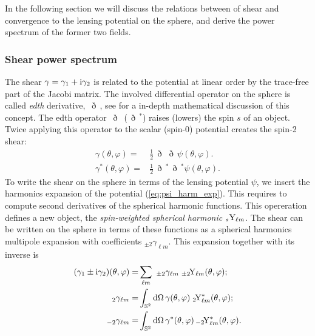 \documentclass[useAMS,usenatbib]{mn2e} %
\newcommand{\edth}{\,\eth\,}
\begin{document}
In the following section we will discuss the relations between of shear and
convergence to the lensing potential on the sphere, and derive the power
spectrum of the former two fields.

\subsubsection{Shear power spectrum}

The shear $\gamma = \gamma_1 + {\rm i} \gamma_2$ is related to the potential at
linear order by the trace-free part of the Jacobi matrix. The involved
differential operator on the sphere is called \emph{edth} derivative, $\edth$,
see \cite{2005PhRvD..72b3516C} for a in-depth mathematical discussion of this
concept. The edth operator $\edth$ ($\edth^\ast$) raises (lowers) the spin $s$
of an object. Twice applying this operator to the scalar (spin-0) potential
creates the spin-2 shear:
%
\begin{align}
  \gamma(\theta, \varphi) = & \frac 1 2 \edth \edth \psi(\theta, \varphi).
    \nonumber \\
  \gamma^\ast(\theta, \varphi) = & \frac 1 2 \edth^\ast \edth^\ast \psi(\theta, \varphi).
  \label{gamma_psi_spher}
\end{align}
%
To write the shear on the sphere in terms of the lensing potential $\psi$, we
insert the harmonics expansion of the potential (\ref{eq:psi_harm_exp}). This
requires to compute second derivatives of the spherical harmonic functions.
This opereration defines a new object, the \emph{spin-weighted spherical
harmonic} $_s{\rm Y}_{\ell m}$. The shear can be written on the sphere in terms
of these functions as a spherical harmonics multipole expansion with
coefficients $_{\pm 2} \gamma_{\ell m}$. This expansion together with its inverse
is
%
%
\begin{align}
  (\gamma_1 \pm {\rm i} \gamma_2)(\theta, \varphi) = & \sum_{\ell m} \,\, _{\pm 2}\gamma_{\ell m} \; _{\pm 2}\!{\rm Y}_{\ell m}(\theta, \varphi);
  \label{eq:gamma_harm_exp}
    \\
  \, _2 \gamma_{\ell m} = & \int_{\mathbb{S}^2} {\rm d} \Omega \, \gamma(\theta, \varphi) \;  _2\!{\rm Y}^\ast_{\ell m}(\theta, \varphi);
    \nonumber \\
  \, _{-2} \gamma_{\ell m} = & \int_{\mathbb{S}^2} {\rm d} \Omega \, \gamma^\ast(\theta, \varphi) \,  _{-2}\!{\rm Y}^\ast_{\ell m}(\theta, \varphi).
  \label{eq:gamma_harm_exp_inv}
\end{align}
\end{document}
